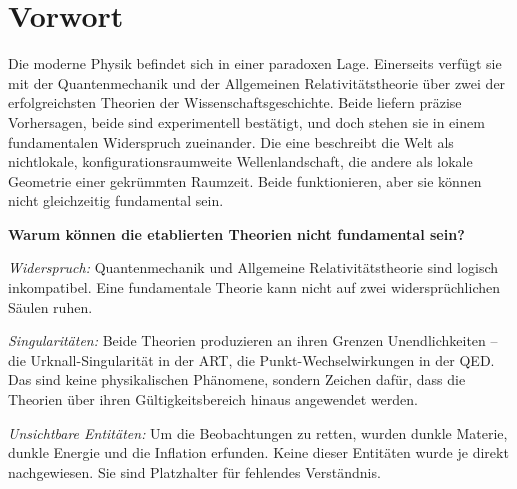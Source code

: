 \documentclass[11pt,a4paper]{book}
\begin{document}

\chapter*{Vorwort}
\label{ch:vorwort}

Die moderne Physik befindet sich in einer paradoxen Lage. Einerseits verfügt sie mit der Quantenmechanik und der Allgemeinen Relativitätstheorie über zwei
der erfolgreichsten Theorien der Wissenschaftsgeschichte. Beide liefern präzise Vorhersagen, beide sind experimentell bestätigt, und doch stehen sie in
einem fundamentalen Widerspruch zueinander. Die eine beschreibt die Welt als nichtlokale, konfigurationsraumweite Wellenlandschaft, die andere als lokale
Geometrie einer gekrümmten Raumzeit. Beide funktionieren, aber sie können nicht gleichzeitig fundamental sein.

\textbf{Warum können die etablierten Theorien nicht fundamental sein?}

\noindent
\textit{Widerspruch:} Quantenmechanik und Allgemeine Relativitätstheorie sind logisch inkompatibel. Eine fundamentale Theorie kann nicht auf zwei
widersprüchlichen Säulen ruhen.

\noindent
\textit{Singularitäten:} Beide Theorien produzieren an ihren Grenzen Unendlichkeiten – die Urknall-Singularität in der ART, die Punkt-Wechselwirkungen in
der QED. Das sind keine physikalischen Phänomene, sondern Zeichen dafür, dass die Theorien über ihren Gültigkeitsbereich hinaus angewendet werden.

\noindent
\textit{Unsichtbare Entitäten:} Um die Beobachtungen zu retten, wurden dunkle Materie, dunkle Energie und die Inflation erfunden. Keine dieser Entitäten
wurde je direkt nachgewiesen. Sie sind Platzhalter für fehlendes Verständnis.
\end{document}

